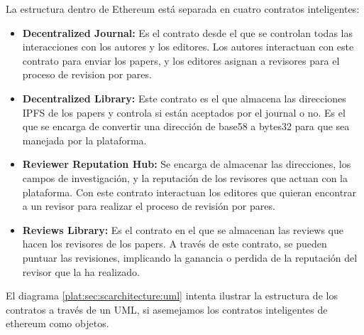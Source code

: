 La estructura dentro de Ethereum está separada en cuatro contratos inteligentes:

\begin{itemize}
\item \textbf{Decentralized Journal:} Es el contrato desde el que se controlan
  todas las interacciones con los autores y los editores. Los autores
  interactuan con este contrato para enviar los papers, y los editores asignan a
  revisores para el proceso de revision por pares.
\item \textbf{Decentralized Library:} Este contrato es el que almacena las
  direcciones IPFS de los papers y controla si están aceptados por el journal o
  no. Es el que se encarga de convertir una dirección de base58 a bytes32 para
  que sea manejada por la plataforma.
\item \textbf{Reviewer Reputation Hub:} Se encarga de almacenar las direcciones,
  los campos de investigación, y la reputación de los revisores que actuan con
  la plataforma. Con este contrato interactuan los editores que quieran
  encontrar a un revisor para realizar el proceso de revisión por pares.
\item \textbf{Reviews Library:} Es el contrato en el que se almacenan las
  reviews que hacen los revisores de los papers. A través de este contrato, se
  pueden puntuar las revisiones, implicando la ganancia o perdida de la
  reputación del revisor que la ha realizado.
\end{itemize}


El diagrama \ref{plat:sec:scarchitecture:uml} intenta ilustrar la estructura de
los contratos a través de un UML, si asemejamos los contratos inteligentes de
ethereum como objetos.



